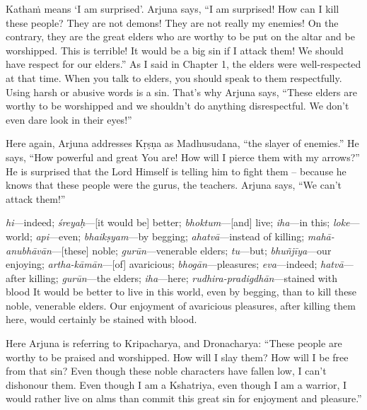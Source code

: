 Kathaṁ means ‘I am surprised’. Arjuna says, “I am surprised! How can I kill these people? They are not demons! They are not really my enemies! On the contrary, they are the great elders who are worthy to be put on the altar and be worshipped. This is terrible! It would be a big sin if I attack them! We should have respect for our elders.” As I said in Chapter 1, the elders were well-respected at that time. When you talk to elders, you should speak to them respectfully. Using harsh or abusive words is a sin. That’s why Arjuna says, “These elders are worthy to be worshipped and we shouldn’t do anything disrespectful. We don’t even dare look in their eyes!”

Here again, Arjuna addresses Kṛṣṇa as Madhusudana, “the slayer of enemies.” He says, “How powerful and great You are! How will I pierce them with my arrows?” He is surprised that the Lord Himself is telling him to fight them -- because he knows that these people were the gurus, the teachers. Arjuna says, “We can’t attack them!”

{%
  \textit{hi}---indeed; 
  \textit{śreyaḥ}---[it would be] better; 
  \textit{bhoktum}---[and] live; 
  \textit{iha}---in this; 
  \textit{loke}---world; 
  \textit{api}---even; 
  \textit{bhaikṣyam}---by begging; 
  \textit{ahatvā}---instead of killing; 
  \textit{mahā-anubhāvān}---[these] noble; 
  \textit{gurūn}---venerable elders; 
  \textit{tu}---but; 
  \textit{bhuñjīya}---our enjoying; 
  \textit{artha-kāmān}---[of] avaricious; 
  \textit{bhogān}---pleasures; 
  \textit{eva}---indeed; 
  \textit{hatvā}---after killing; 
  \textit{gurūn}---the elders; 
  \textit{iha}---here; 
  \textit{rudhira-pradigdhān}---stained with blood
}
{%
  It would be better to live in this world, even by begging, than to kill these noble, venerable elders. Our enjoyment of avaricious pleasures, after killing them here, would certainly be stained with blood.
}

Here Arjuna is referring to Kripacharya, and Dronacharya: “These people are worthy to be praised and worshipped. How will I slay them? How will I be free from that sin? Even though these noble characters have fallen low, I can’t dishonour them. Even though I am a Kshatriya, even though I am a warrior, I would rather live on alms than commit this great sin for enjoyment and pleasure.”

